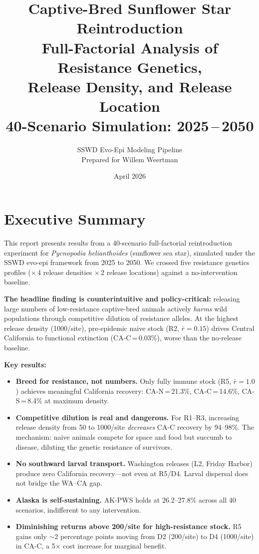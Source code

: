 \documentclass[11pt,a4paper]{article}
\title{%
  \vspace{-1cm}
  {\Large\bfseries Captive-Bred Sunflower Star Reintroduction}\\[0.3em]
  {\large Full-Factorial Analysis of Resistance Genetics,\\
  Release Density, and Release Location}\\[0.5em]
  {\normalsize 40-Scenario Simulation: 2025\,--\,2050}
}
\author{%
  SSWD Evo-Epi Modeling Pipeline\\
  \small Prepared for Willem Weertman
}
\date{April 2026}
\newcommand{\rbar}{\ensuremath{\bar{r}}}
\begin{document}
\maketitle
\thispagestyle{fancy}

\section{Executive Summary}

This report presents results from a 40-scenario full-factorial reintroduction experiment for \textit{Pycnopodia helianthoides} (sunflower sea star), simulated under the SSWD evo-epi framework from 2025 to 2050. We crossed five resistance genetics profiles ($\times$\,4 release densities $\times$\,2 release locations) against a no-intervention baseline.

\textbf{The headline finding is counterintuitive and policy-critical:} releasing large numbers of low-resistance captive-bred animals actively \emph{harms} wild populations through competitive dilution of resistance alleles. At the highest release density (1000/site), pre-epidemic naive stock (R2, $\rbar=0.15$) drives Central California to functional extinction (CA-C\,=\,0.03\%), worse than the no-release baseline.

\medskip
\textbf{Key results:}
\begin{itemize}[nosep]
  \item \textbf{Breed for resistance, not numbers.} Only fully immune stock (R5, $\rbar=1.0$) achieves meaningful California recovery: CA-N\,=\,21.3\%, CA-C\,=\,14.6\%, CA-S\,=\,8.4\% at maximum density.
  \item \textbf{Competitive dilution is real and dangerous.} For R1--R3, increasing release density from 50 to 1000/site \emph{decreases} CA-C recovery by 94--98\%. The mechanism: naive animals compete for space and food but succumb to disease, diluting the genetic resistance of survivors.
  \item \textbf{No southward larval transport.} Washington releases (L2, Friday Harbor) produce zero California recovery---not even at R5/D4. Larval dispersal does not bridge the WA--CA gap.
  \item \textbf{Alaska is self-sustaining.} AK-PWS holds at 26.2--27.8\% across all 40 scenarios, indifferent to any intervention.
  \item \textbf{Diminishing returns above 200/site for high-resistance stock.} R5 gains only ${\sim}$2 percentage points moving from D2 (200/site) to D4 (1000/site) in CA-C, a 5$\times$ cost increase for marginal benefit.
\end{itemize}
\end{document}
